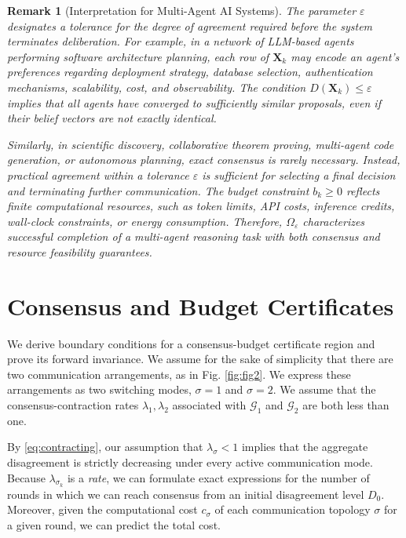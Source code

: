 \documentclass[journal,twoside,web]{ieeecolor_no_firstpage_logo}
\newtheorem{remark}{Remark}
\begin{document}
\begin{remark}[Interpretation for Multi-Agent AI Systems] The parameter $\varepsilon$ designates a tolerance for the degree of agreement required
before the system terminates deliberation.
For example, in a network of LLM-based agents performing software
architecture planning, each row of $\mathbf{X}_k$ may encode an agent's
preferences regarding deployment strategy, database selection,
authentication mechanisms, scalability, cost, and observability.
The condition
$ D(\mathbf{X}_k)\le\varepsilon $
implies that all agents have converged to sufficiently similar
proposals, even if their belief vectors are not exactly identical.

Similarly, in scientific discovery, collaborative theorem proving,
multi-agent code generation, or autonomous planning, exact consensus
is rarely necessary. Instead, practical agreement within a tolerance
$\varepsilon$ is sufficient for selecting a final decision and
terminating further communication.
The budget constraint $b_k\ge0$ reflects finite computational resources,
such as token limits, API costs, inference credits, wall-clock
constraints, or energy consumption. Therefore,
$\Omega_\varepsilon$ characterizes successful completion of a
multi-agent reasoning task with both consensus and resource
feasibility guarantees.
\end{remark}

\section{Consensus and Budget Certificates}
We derive boundary conditions for a consensus-budget certificate region and prove its forward invariance. We assume for the sake of simplicity that there are two communication arrangements, as in Fig. \ref{fig:fig2}. We express these arrangements as two switching modes, $\sigma = 1$ and $\sigma = 2$. We assume that the consensus-contraction rates $\lambda_{1}, \lambda_2$ associated with $\mathcal{G}_{1}$ and $\mathcal{G}_{2}$ are both less than one.

By \eqref{eq:contracting}, our assumption that $\lambda_\sigma < 1$ implies that the aggregate disagreement is strictly decreasing under every active
communication mode. Because $\lambda_{\sigma_k}$ is a \textit{rate}, we can formulate exact expressions for the number of rounds in which we can reach consensus from an initial disagreement level $D_0$. Moreover, given the computational cost $c_\sigma$ of each communication topology $\sigma$ for a given round, we can predict the total cost. 
\end{document}
